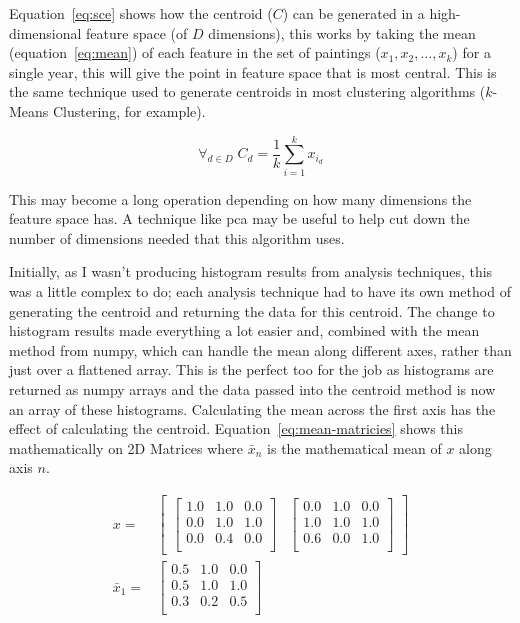 Equation~\ref{eq:sce} shows how the centroid ($C$) can be generated in a high-dimensional feature 
space (of $D$ dimensions), this works by taking the mean (equation~\ref{eq:mean}) of each feature 
in the set of paintings ($x_1, x_2,\dotsc,x_k$) for a single year, this will give the point in 
feature space that is most central. This is the same technique used to generate centroids in most 
clustering algorithms ($k$-Means Clustering, for example).

\begin{equation}
\label{eq:sce}
\forall_{d \in D}\;C_d = \frac{1}{k}\sum^{k}_{i=1}{x_{i_{d}}}
\end{equation}

This may become a long operation depending on how many dimensions the feature space has. A
technique like \gls{pca} may be useful to help cut down the number of dimensions needed that this
algorithm uses.

Initially, as I wasn't producing histogram results from analysis techniques, this was a little
complex to do; each analysis technique had to have its own method of generating the centroid and
returning the data for this centroid. The change to histogram results made everything a lot easier
and, combined with the mean method from numpy, which can handle the mean along 
different axes, rather than just over a flattened array. This is the perfect too for the job as
histograms are returned as numpy arrays and the data passed into the centroid method is now an 
array of these histograms. Calculating the mean across the first axis has the effect of 
calculating the centroid. Equation~\ref{eq:mean-matricies} shows this mathematically on 2D 
Matrices where $\bar{x}_n$ is the mathematical mean of $x$ along axis $n$.

\begin{align}
x=&\begin{bmatrix}
\begin{bmatrix}
1.0 & 1.0 & 0.0 \\
0.0 & 1.0 & 1.0 \\
0.0 & 0.4 & 0.0 \\
\end{bmatrix} & 
\begin{bmatrix}
0.0 & 1.0 & 0.0 \\
1.0 & 1.0 & 1.0 \\
0.6 & 0.0 & 1.0 \\
\end{bmatrix}
\end{bmatrix} \nonumber \\
\bar{x}_1 =& 
\begin{bmatrix}
0.5 & 1.0 & 0.0 \\
0.5 & 1.0 & 1.0 \\
0.3 & 0.2 & 0.5 \\
\end{bmatrix}
\label{eq:mean-matricies}
\end{align}


